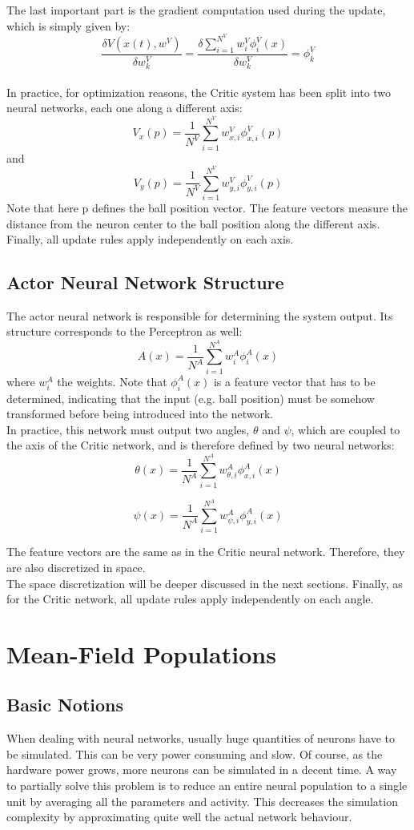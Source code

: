 \documentclass{article}
\begin{document}
The last important part is the gradient computation used during the update, which is simply given by:
\[
\frac{\delta V(x(t), w^{V})}{\delta w_{k}^{V}} = \frac{\delta \sum_{i=1}^{N^{V}}{w_{i}^{V}\phi_{i}^{V}(x)}}{\delta w_{k}^{V}} = \phi_{k}^{V}
\]
\\
In practice, for optimization reasons, the Critic system has been split into two neural networks, each one along a different axis:
\[
V_{x}(p) = \frac{1}{N^{V}} \sum_{i=1}^{N^{V}}{w_{x,i}^{V}\phi_{x,i}^{V}(p)}
\]
and
\[
V_{y}(p) = \frac{1}{N^{V}} \sum_{i=1}^{N^{V}}{w_{y,i}^{V}\phi_{y,i}^{V}(p)}
\]
Note that here p defines the ball position vector. The feature vectors measure the distance from the neuron center to the ball position along the different axis. Finally, all update rules apply independently on each axis.


\subsection{Actor Neural Network Structure}
The actor neural network is responsible for determining the system output. Its structure corresponds to the Perceptron as well:
\[
A(x) = \frac{1}{N^{A}} \sum_{i=1}^{N^{A}}{w_{i}^{A}\phi_{i}^{A}(x)}
\]
where \(w_{i}^{A}\) the weights. Note that \(\phi_{i}^{A}(x)\) is a feature vector that has to be determined, indicating that the input (e.g. ball position) must be somehow transformed before being introduced into the network. \\
In practice, this network must output two angles, \(\theta\) and \(\psi\), which are coupled to the axis of the Critic network, and is therefore defined by two neural networks:
\[
\theta (x) = \frac{1}{N^{A}} \sum_{i=1}^{N^{A}}{w_{\theta, i}^{A}\phi_{x,i}^{A}(x)}
\]

\[
\psi (x) = \frac{1}{N^{A}} \sum_{i=1}^{N^{A}}{w_{\psi, i}^{A}\phi_{y,i}^{A}(x)}
\]

The feature vectors are the same as in the Critic neural network. Therefore, they are also discretized in space.\\
The space discretization will be deeper discussed in the next sections. Finally, as for the Critic network, all update rules apply independently on each angle.


\section{Mean-Field Populations}

\subsection{Basic Notions}
When dealing with neural networks, usually huge quantities of neurons have to be simulated. This can be very power consuming and slow. Of course, as the hardware power grows, more neurons can be simulated in a decent time. A way to partially solve this problem is to reduce an entire neural population to a single unit by averaging all the parameters and activity. This decreases the simulation complexity by approximating quite well the actual network behaviour. \\
\end{document}
